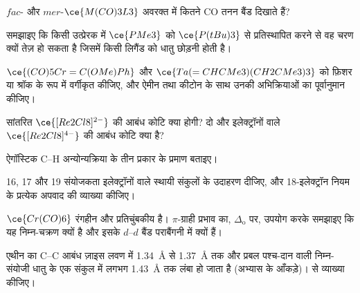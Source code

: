 \begin{exercise}[$\star\star$]\label{exo:b3:organometallic-bonding:5}
$fac$- और $mer$-$\ce{M(CO)3L3}$ अवरक्त में कितने CO तनन बैंड दिखाते हैं?
\end{exercise}

\begin{exercise}[$\star\star$]\label{exo:b3:organometallic-bonding:6}
समझाइए कि किसी उत्प्रेरक में $\ce{PMe3}$ को $\ce{P(tBu)3}$ से प्रतिस्थापित करने से वह चरण क्यों तेज़ हो सकता है जिसमें
किसी लिगैंड को धातु छोड़नी होती है।
\end{exercise}

\begin{exercise}[$\star\star$]\label{exo:b3:organometallic-bonding:7}
$\ce{(CO)5Cr=C(OMe)Ph}$ और $\ce{Ta(=CHCMe3)(CH2CMe3)3}$ को फ़िशर या श्रॉक  के रूप में वर्गीकृत कीजिए, और ऐमीन तथा कीटोन के साथ उनकी अभिक्रियाओं का पूर्वानुमान कीजिए।
\end{exercise}

\begin{exercise}[$\star\star$]\label{exo:b3:organometallic-bonding:8}
सांतरित $\ce{[Re2Cl8]^{2-}}$ की आबंध कोटि क्या होगी? दो और इलेक्ट्रॉनों वाले
$\ce{[Re2Cl8]^{4-}}$ की आबंध कोटि क्या है?
\end{exercise}

\begin{exercise}[$\star\star$]\label{exo:b3:organometallic-bonding:9}
ऐगॉस्टिक C--H अन्योन्यक्रिया के तीन प्रकार के प्रमाण बताइए।
\end{exercise}

\begin{exercise}[$\star\star\star$]\label{exo:b3:organometallic-bonding:10}
16, 17 और 19 संयोजकता इलेक्ट्रॉनों वाले स्थायी संकुलों के उदाहरण दीजिए, और 18-इलेक्ट्रॉन
नियम के प्रत्येक अपवाद की व्याख्या कीजिए।
\end{exercise}

\begin{exercise}[$\star\star\star$]\label{exo:b3:organometallic-bonding:11}
$\ce{Cr(CO)6}$ रंगहीन और प्रतिचुंबकीय है। $\pi$-ग्राही प्रभाव का, $\Delta_{\mathrm o}$ पर, उपयोग करके समझाइए
कि यह निम्न-चक्रण क्यों है और इसके $d$--$d$ बैंड पराबैंगनी में क्यों हैं।
\end{exercise}

\begin{exercise}[$\star\star\star$]\label{exo:b3:organometallic-bonding:12}
एथीन का C--C आबंध ज़ाइस लवण में \qty{1.34}{\angstrom} से \qty{1.37}{\angstrom} तक और
प्रबल पश्च-दान वाली निम्न-संयोजी धातु के एक संकुल में लगभग \qty{1.43}{\angstrom} तक लंबा हो जाता है (अभ्यास के
आँकड़े)।  से व्याख्या कीजिए।
\end{exercise}

